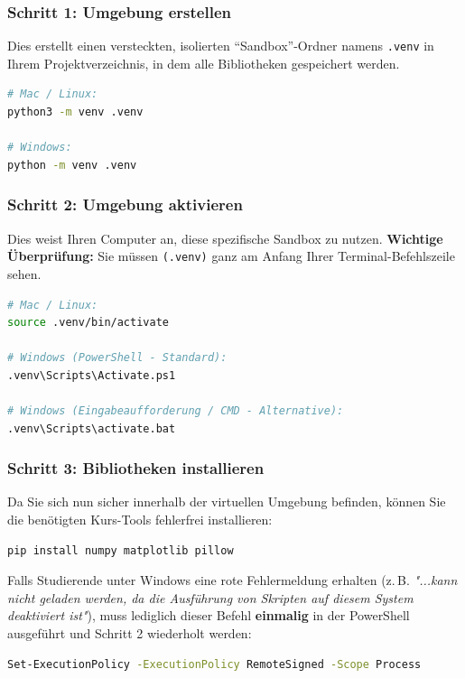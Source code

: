 \subsubsection*{Schritt 1: Umgebung erstellen}
Dies erstellt einen versteckten, isolierten "`Sandbox"'-Ordner namens \texttt{.venv} in Ihrem Projektverzeichnis, in dem alle Bibliotheken gespeichert werden.
\begin{lstlisting}[language=bash]
# Mac / Linux:
python3 -m venv .venv

# Windows:
python -m venv .venv
\end{lstlisting}

\subsubsection*{Schritt 2: Umgebung aktivieren}
Dies weist Ihren Computer an, diese spezifische Sandbox zu nutzen. \textbf{Wichtige Überprüfung:} Sie müssen \texttt{(.venv)} ganz am Anfang Ihrer Terminal-Befehlszeile sehen.
\begin{lstlisting}[language=bash]
# Mac / Linux:
source .venv/bin/activate

# Windows (PowerShell - Standard):
.venv\Scripts\Activate.ps1

# Windows (Eingabeaufforderung / CMD - Alternative):
.venv\Scripts\activate.bat
\end{lstlisting}

\subsubsection*{Schritt 3: Bibliotheken installieren}
Da Sie sich nun sicher innerhalb der virtuellen Umgebung befinden, können Sie die benötigten Kurs-Tools fehlerfrei installieren:
\begin{lstlisting}[language=bash]
pip install numpy matplotlib pillow
\end{lstlisting}

\vspace{1.5em}

\begin{tcolorbox}[title=\textbf{⚠️ Windows-Fehlerbehebung (Skript-Ausführungsfehler)}, fonttitle=\bfseries]
Falls Studierende unter Windows eine rote Fehlermeldung erhalten (z.\,B. \textit{"...kann nicht geladen werden, da die Ausführung von Skripten auf diesem System deaktiviert ist"}), muss lediglich dieser Befehl \textbf{einmalig} in der PowerShell ausgeführt und Schritt 2 wiederholt werden:
\begin{lstlisting}[language=bash, backgroundcolor=\color{white}, frame=none]
Set-ExecutionPolicy -ExecutionPolicy RemoteSigned -Scope Process
\end{lstlisting}
\end{tcolorbox}


